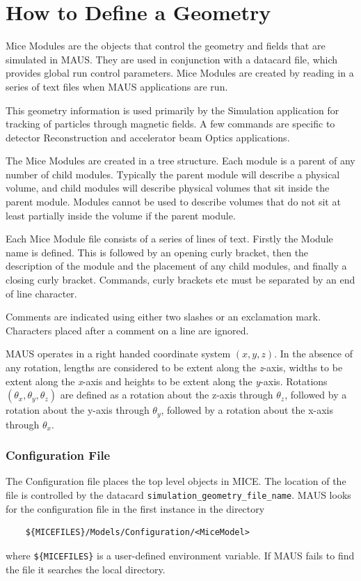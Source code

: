 \chapter{How to Define a Geometry}
Mice Modules are the objects that control the geometry and fields that are simulated in MAUS. They are used in
conjunction with a datacard file, which provides global run control parameters. Mice Modules are created by reading in
a series of text files when MAUS applications are run.

This geometry information is used primarily by the Simulation application for tracking of particles through magnetic
fields. A few commands are specific to detector Reconstruction and accelerator beam Optics applications.

The Mice Modules are created in a tree structure. Each module is a parent of any number of child modules. Typically the
parent module will describe a physical volume, and child modules will describe physical volumes that sit inside the
parent module. Modules cannot be used to describe volumes that do not sit at least partially inside the volume if the
parent module.

Each Mice Module file consists of a series of lines of text. Firstly the Module name is defined. This is followed by an
opening curly bracket, then the description of the module and the placement of any child modules, and finally a closing
curly bracket. Commands, curly brackets etc must be separated by an end of line character.

Comments are indicated using either two slashes or an exclamation mark. Characters placed after a comment on a line are
ignored.

MAUS operates in a right handed coordinate system $(x,y,z)$. In the absence of any rotation, lengths are
considered to be extent along the \textit{z}{}-axis, widths to be extent along the \textit{x}{}-axis and heights to be
extent along the \textit{y}{}-axis. Rotations $(\theta_{x}, \theta_{y}, \theta_{z})$ are defined
as a rotation about the z-axis through $\theta_{z}$, followed by a rotation about the y-axis through
$\theta_{y}$, followed by a rotation about the x-axis through $\theta_{x}$.

\subsection{Configuration File}
The Configuration file places the top level objects in MICE. The location of the file is controlled by the datacard
\verb|simulation_geometry_file_name|. MAUS looks for the configuration file in the first instance in the directory
\begin{verbatim}
    ${MICEFILES}/Models/Configuration/<MiceModel>
\end{verbatim}
where \verb|${MICEFILES}| is a user-defined environment variable. If MAUS fails to find the file it searches the
local directory.

